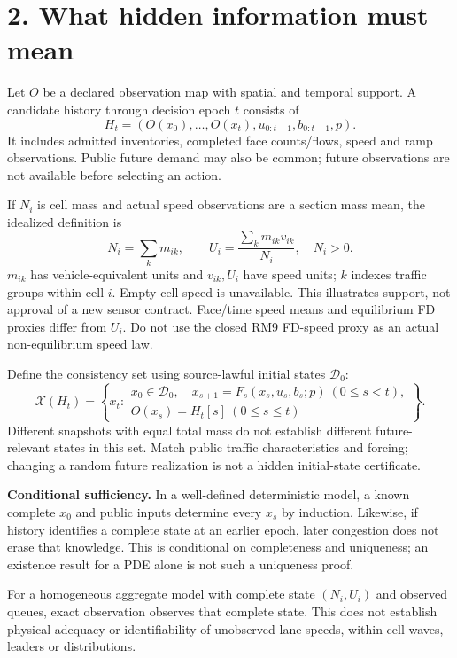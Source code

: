 \documentclass[11pt,a4paper]{article}
\begin{document}
\newpage
\section*{2. What hidden information must mean}
Let $O$ be a declared observation map with spatial and temporal support. A candidate
history through decision epoch $t$ consists of
\[
 H_t=(O(x_0),\ldots,O(x_t),u_{0:t-1},b_{0:t-1},p).
\]
It includes admitted inventories, completed face counts/flows, speed and ramp
observations. Public future demand may also be common; future observations are
not available before selecting an action.

If $N_i$ is cell mass and actual speed observations are a section mass mean, the
idealized definition is
\[
 N_i=\sum_k m_{ik},\qquad
 U_i=\frac{\sum_k m_{ik}v_{ik}}{N_i},\quad N_i>0.
\]
$m_{ik}$ has vehicle-equivalent units and $v_{ik},U_i$ have speed units; $k$
indexes traffic groups within cell $i$. Empty-cell speed is unavailable.
This illustrates support, not approval of a new sensor contract. Face/time speed
means and equilibrium FD proxies differ from $U_i$. Do not use the closed RM9
FD-speed proxy as an actual non-equilibrium speed law.

Define the consistency set using source-lawful initial states $\mathcal D_0$:
\[
 \mathcal X(H_t)=
 \left\{x_t:\begin{array}{l}
 x_0\in\mathcal D_0,\quad x_{s+1}=F_s(x_s,u_s,b_s;p)\ (0\leq s<t),\\
 O(x_s)=H_t[s]\ (0\leq s\leq t)
 \end{array}\right\}.
\]
Different snapshots with equal total mass do not
establish different future-relevant states in this set. Match public traffic
characteristics and forcing; changing a random future realization is not a
hidden initial-state certificate.

\textbf{Conditional sufficiency.} In a well-defined deterministic model, a known
complete $x_0$ and public inputs determine every $x_s$ by induction. Likewise,
if history identifies a complete state at an earlier epoch, later congestion
does not erase that knowledge. This is conditional on completeness and uniqueness;
an existence result for a PDE alone is not such a uniqueness proof.

For a homogeneous aggregate model with complete state $(N_i,U_i)$ and observed
queues, exact observation observes that complete state. This does not establish
physical adequacy or identifiability of unobserved lane speeds, within-cell waves,
leaders or distributions.
\end{document}
